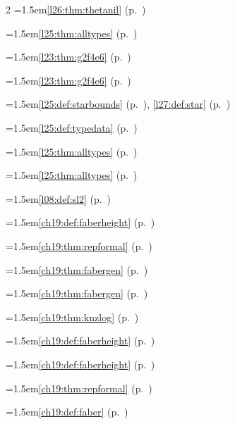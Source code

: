 \begin{multicols}{2}
\hangindent=1.5em\quad \ref{l26:thm:thetanil} (p.~\pageref{l26:thm:thetanil})\par
\hangindent=1.5em\quad \ref{l25:thm:alltypes} (p.~\pageref{l25:thm:alltypes})\par
\hangindent=1.5em\quad \ref{l23:thm:g2f4e6} (p.~\pageref{l23:thm:g2f4e6})\par
\hangindent=1.5em\quad \ref{l23:thm:g2f4e6} (p.~\pageref{l23:thm:g2f4e6})\par
\hangindent=1.5em\quad \ref{l25:def:starbounds} (p.~\pageref{l25:def:starbounds}), \ref{l27:def:star} (p.~\pageref{l27:def:star})\par
\hangindent=1.5em\quad \ref{l25:def:typedata} (p.~\pageref{l25:def:typedata})\par
\hangindent=1.5em\quad \ref{l25:thm:alltypes} (p.~\pageref{l25:thm:alltypes})\par
\hangindent=1.5em\quad \ref{l25:thm:alltypes} (p.~\pageref{l25:thm:alltypes})\par
\hangindent=1.5em\quad \ref{l08:def:sl2} (p.~\pageref{l08:def:sl2})\par
\hangindent=1.5em\quad \ref{ch19:def:faberheight} (p.~\pageref{ch19:def:faberheight})\par
\hangindent=1.5em\quad \ref{ch19:thm:repformal} (p.~\pageref{ch19:thm:repformal})\par
\hangindent=1.5em\quad \ref{ch19:thm:fabergen} (p.~\pageref{ch19:thm:fabergen})\par
\hangindent=1.5em\quad \ref{ch19:thm:fabergen} (p.~\pageref{ch19:thm:fabergen})\par
\hangindent=1.5em\quad \ref{ch19:thm:knzlog} (p.~\pageref{ch19:thm:knzlog})\par
\hangindent=1.5em\quad \ref{ch19:def:faberheight} (p.~\pageref{ch19:def:faberheight})\par
\hangindent=1.5em\quad \ref{ch19:def:faberheight} (p.~\pageref{ch19:def:faberheight})\par
\hangindent=1.5em\quad \ref{ch19:thm:repformal} (p.~\pageref{ch19:thm:repformal})\par
\hangindent=1.5em\quad \ref{ch19:def:faber} (p.~\pageref{ch19:def:faber})\par

\end{multicols}
